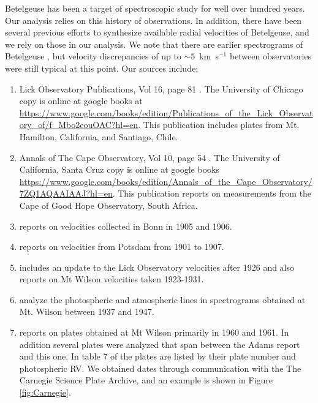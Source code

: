 \documentclass[twocolumn]{aastex631}
\begin{document}
Betelgeuse has been a target of spectroscopic study for well over hundred years. Our analysis relies on this history of observations. In addition, there have been several previous efforts to synthesize available radial velocities of Betelgeuse, and we rely on those in our analysis. We note that there are earlier spectrograms of Betelgeuse \citep[e.g.][]{1868RSPT..158..529H,1892Obs....15..393M}, but velocity discrepancies of up to $\sim 5$~km~s$^{-1}$ between observatories were still typical at this point. Our sources include:
\begin{enumerate}
    \item Lick Observatory Publications, Vol 16, page 81 \citep{1928PLicO..16....1C}. The University of Chicago copy is online at google books at \url{https://www.google.com/books/edition/Publications_of_the_Lick_Observatory_of/f_Mbo2eouOAC?hl=en}.  This publication includes plates from Mt. Hamilton, California, and Santiago, Chile. 
    
    \item Annals of The Cape Observatory, Vol 10, page 54 \citep{1911AnCap..10....1H}. The University of California, Santa Cruz copy is online at google books \url{https://www.google.com/books/edition/Annals_of_the_Cape_Observatory/7ZQ1AQAAIAAJ?hl=en}. This publication reports on measurements from the Cape of Good Hope Observatory, South Africa.

    \item \citet{1908ApJ....27..301K} reports on velocities collected in Bonn in 1905 and 1906. 

    \item \citet{1911AN....187...33B} reports on velocities from Potsdam from 1901 to 1907. 

    \item \citet{1933ApJ....77..110S}  includes an update to the Lick Observatory velocities after 1926 and also reports on Mt Wilson velocities taken 1923-1931. 

    \item \citet{1956ApJ...123..189A} analyze the photospheric and atmospheric lines in spectrograms obtained at Mt. Wilson between 1937 and 1947. 

    \item 
    \citet{1962ApJ...136..844W} reports on plates obtained at Mt Wilson primarily in 1960 and 1961. In addition several plates were analyzed that span between the Adams report and this one. In table 7 of \citet{1962ApJ...136..844W} the plates are listed by their plate number and photospheric RV. We obtained dates through communication with the The Carnegie Science Plate Archive, and an example is shown in Figure \ref{fig:Carnegie}.


\end{enumerate}
\end{document}
